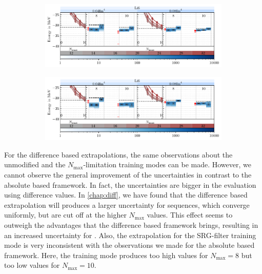 \begin{figure}[H]
  \caption{Evaluation results for the  nucleus using the absolute \textbf{(a)} and the difference based extrapolation \textbf{(b)}. The shown training modes are, in order from left to right, the unmodified training mode for comparison, the $N_\mathrm{max}$-limitation training mode and the SRG-filter training mode. For each nucleus and each flow parameter, the NCSM sequences are shown on the left and the extrapolations for a given maximum $N_\mathrm{max}$ on the right. For each maximum $N_\mathrm{max}$, the variational boundary is shown as a dotted line, and the classical extrapolations are shown as red ticks.}

  \label{fig:eval_li6}
  \begin{subfigure}{\textwidth}
    \caption{}
    \includegraphics[width=\textwidth]{media/li6_evaluation_abs.pdf}
  \end{subfigure}
  \begin{subfigure}{\textwidth}
    \caption{}
    \includegraphics[width=\textwidth]{media/li6_evaluation_diff.pdf}
  \end{subfigure}
\end{figure}

For the difference based extrapolations, the same observations about the unmodified and the $N_\mathrm{max}$-limitation training modes can be made. However, we cannot observe the general improvement of the uncertainties in contrast to the absolute based framework. In fact, the uncertainties are bigger in the evaluation using difference values. In \autoref{chap:diff}, we have found that the difference based extrapolation will produces a larger uncertainty for sequences, which converge uniformly, but are cut off at the higher $N_\mathrm{max}$ values. This effect seems to outweigh the advantages that the difference based framework brings, resulting in an increased uncertainty for . Also, the extrapolation for the SRG-filter training mode is very inconsistent with the observations we made for the absolute based framework. Here, the training mode produces too high values for $N_\mathrm{max} = 8$ but too low values for $N_\mathrm{max} = 10$.
